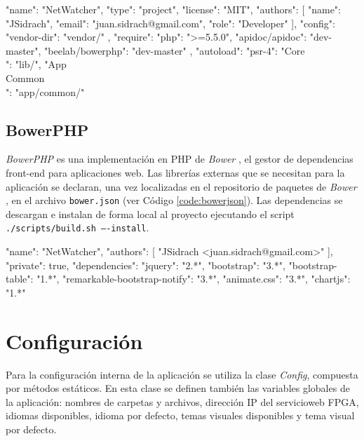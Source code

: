 \begin{code}[label=code:composerjson,language=json,caption=Ejemplo de fichero \textit{composer.json}]
{
  "name": "NetWatcher",
  "type": "project",
  "license": "MIT",
  "authors": [
    {
      "name": "JSidrach",
      "email": "juan.sidrach@gmail.com",
      "role": "Developer"
    }
  ],
  "config": {
    "vendor-dir": "vendor/"
   },
  "require": {
    "php": ">=5.5.0",
    "apidoc/apidoc": "dev-master",
    "beelab/bowerphp": "dev-master"
  },
  "autoload": {
    "psr-4": {
      "Core\\": "lib/",
      "App\\Common\\": "app/common/"
    }
  }
}
\end{code}

\subsection*{BowerPHP\label{extra:mvc:bowerphp}}

\textit{BowerPHP} es una implementación en \gls{PHP} de \textit{Bower} \cite{bower}, el gestor de dependencias \gls{front-end} para aplicaciones web. Las librerías externas que se necesitan para la aplicación se declaran, una vez localizadas en el repositorio de paquetes de \textit{Bower} \cite{bowerrepositorio}, en el archivo \texttt{bower.json} (ver Código \ref{code:bowerjson}). Las dependencias se descargan e instalan de forma local al proyecto ejecutando el \gls{script} \texttt{./scripts/build.sh ----install}.

\begin{code}[label=code:bowerjson,language=json,caption=Ejemplo de fichero \textit{bower.json}]
{
  "name": "NetWatcher",
  "authors": [
    "JSidrach <juan.sidrach@gmail.com>"
  ],
  "private": true,
  "dependencies": {
    "jquery": "2.*",
    "bootstrap": "3.*",
    "bootstrap-table": "1.*",
    "remarkable-bootstrap-notify": "3.*",
    "animate.css": "3.*",
    "chartjs": "1.*"
  }
}
\end{code}

\section{Configuración\label{extra:mvc:config}}

Para la configuración interna de la aplicación se utiliza la clase \textit{Config}, compuesta por métodos estáticos. En esta clase se definen también las variables globales de la aplicación: nombres de carpetas y archivos, dirección IP del \gls{servicioweb} \gls{FPGA}, idiomas disponibles, idioma por defecto, temas visuales disponibles y tema visual por defecto.

